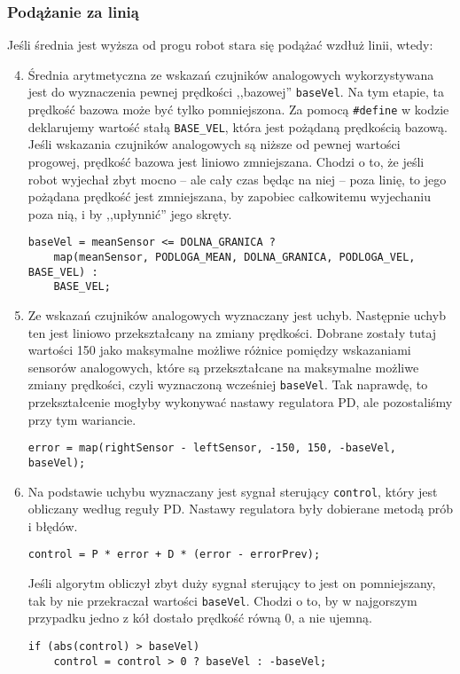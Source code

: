\documentclass[11pt]{article}
\begin{document}
\subsubsection*{Podążanie za linią}
Jeśli średnia jest wyższa od progu robot stara się podążać wzdłuż linii, wtedy:
\begin{enumerate}
\setcounter{enumi}{3}
\item Średnia arytmetyczna ze wskazań czujników analogowych wykorzystywana jest do wyznaczenia pewnej prędkości ,,bazowej'' \texttt{baseVel}. Na tym etapie, ta prędkość bazowa może być tylko pomniejszona. Za pomocą \texttt{\#define} w kodzie deklarujemy wartość stałą \texttt{BASE\_VEL}, która jest pożądaną prędkością bazową. Jeśli wskazania czujników analogowych są niższe od pewnej wartości progowej, prędkość bazowa jest liniowo zmniejszana. Chodzi o to, że jeśli robot wyjechał zbyt mocno -- ale cały czas będąc na niej -- poza linię, to jego pożądana prędkość jest zmniejszana, by zapobiec całkowitemu wyjechaniu poza nią, i by ,,upłynnić'' jego skręty.
\begin{lstlisting}[firstnumber = 94]
baseVel = meanSensor <= DOLNA_GRANICA ?
	map(meanSensor, PODLOGA_MEAN, DOLNA_GRANICA, PODLOGA_VEL, BASE_VEL) :
	BASE_VEL;
\end{lstlisting}

\item Ze wskazań czujników analogowych wyznaczany jest uchyb. Następnie uchyb ten jest liniowo przekształcany na zmiany prędkości. Dobrane zostały tutaj wartości 150 jako maksymalne możliwe różnice pomiędzy wskazaniami sensorów analogowych, które są przekształcane na maksymalne możliwe zmiany prędkości, czyli wyznaczoną wcześniej \texttt{baseVel}. Tak naprawdę, to przekształcenie mogłyby wykonywać nastawy regulatora PD, ale pozostaliśmy przy tym wariancie.
\begin{lstlisting}[firstnumber = 101]
error = map(rightSensor - leftSensor, -150, 150, -baseVel, baseVel);
\end{lstlisting}

\item Na podstawie uchybu wyznaczany jest sygnał sterujący \texttt{control}, który jest obliczany według reguły PD. Nastawy regulatora były dobierane metodą prób i błędów.
\begin{lstlisting}[firstnumber = 104]
control = P * error + D * (error - errorPrev);
\end{lstlisting}

Jeśli algorytm obliczył zbyt duży sygnał sterujący to jest on pomniejszany, tak by nie przekraczał wartości \texttt{baseVel}. Chodzi o to, by w najgorszym przypadku jedno z kół dostało prędkość równą 0, a nie ujemną.
\begin{lstlisting}[firstnumber = 108]
if (abs(control) > baseVel)
	control = control > 0 ? baseVel : -baseVel;
\end{lstlisting}


\end{enumerate}
\end{document}
